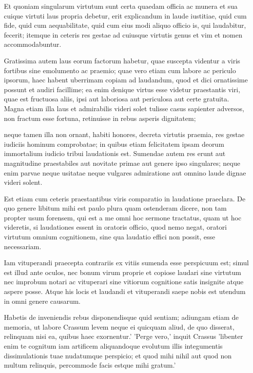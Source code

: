  Et quoniam singularum virtutum sunt certa quaedam officia ac munera et sua cuique virtuti laus propria debetur, erit explicandum in laude iustitiae, quid cum fide, quid cum aequabilitate, quid cum eius modi aliquo officio is, qui laudabitur, fecerit; itemque in ceteris res gestae ad cuiusque virtutis genus et vim et nomen accommodabuntur.

 Gratissima autem laus eorum factorum habetur, quae suscepta videntur a viris fortibus sine emolumento ac praemio; quae vero etiam cum labore ac periculo ipsorum, haec habent uberrimam copiam ad laudandum, quod et dici ornatissime possunt et audiri facillime; ea enim denique virtus esse videtur praestantis viri, quae est fructuosa aliis, ipsi aut laboriosa aut periculosa aut certe gratuita. Magna etiam illa laus et admirabilis videri solet tulisse casus sapienter adversos, non fractum esse fortuna, retinuisse in rebus asperis dignitatem;

 neque tamen illa non ornant, habiti honores, decreta virtutis praemia, res gestae iudiciis hominum comprobatae; in quibus etiam felicitatem ipsam deorum immortalium iudicio tribui laudationis est. Sumendae autem res erunt aut magnitudine praestabiles aut novitate primae aut genere ipso singulares; neque enim parvae neque usitatae neque vulgares admiratione aut omnino laude dignae videri solent.

 Est etiam cum ceteris praestantibus viris comparatio in laudatione praeclara. De quo genere libitum mihi est paulo plura quam ostenderam dicere, non tam propter usum forensem, qui est a me omni hoc sermone tractatus, quam ut hoc videretis, si laudationes essent in oratoris officio, quod nemo negat, oratori virtutum omnium cognitionem, sine qua laudatio effici non possit, esse necessariam.

 Iam vituperandi praecepta contrariis ex vitiis sumenda esse perspicuum est; simul est illud ante oculos, nec bonum virum proprie et copiose laudari sine virtutum nec improbum notari ac vituperari sine vitiorum cognitione satis insignite atque aspere posse. Atque his locis et laudandi et vituperandi saepe nobis est utendum in omni genere causarum.

 Habetis de inveniendis rebus disponendisque quid sentiam; adiungam etiam de memoria, ut labore Crassum levem neque ei quicquam aliud, de quo disserat, relinquam nisi ea, quibus haec exornentur.' 'Perge vero,' inquit Crassus 'libenter enim te cognitum iam artificem aliquandoque evolutum illis integumentis dissimulationis tuae nudatumque perspicio; et quod mihi nihil aut quod non multum relinquis, percommode facis estque mihi gratum.'


